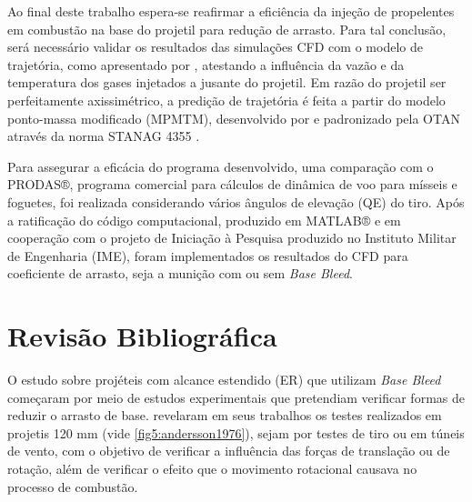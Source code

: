 Ao final deste trabalho espera-se reafirmar a eficiência da injeção de propelentes em combustão na base do projetil para redução de arrasto. Para tal conclusão, será necessário validar os resultados das simulações CFD com o modelo de trajetória, como apresentado por \cite{Rosendo2020}, atestando a influência da vazão e da temperatura dos gases injetados a jusante do projetil. Em razão do projetil ser perfeitamente axissimétrico, a predição de trajetória é feita a partir do modelo ponto-massa modificado (MPMTM), desenvolvido por \cite{Lieske1966} e padronizado pela OTAN através da norma STANAG 4355 \cite{stanag4355}. 

Para assegurar a eficácia do programa desenvolvido, uma comparação com o PRODAS®, programa comercial para cálculos de dinâmica de voo para mísseis e foguetes, foi realizada considerando vários ângulos de elevação (QE) do tiro. Após a ratificação do código computacional, produzido em MATLAB® e em cooperação com o projeto de Iniciação à Pesquisa produzido no Instituto Militar de Engenharia (IME), foram implementados os resultados do CFD para coeficiente de arrasto, seja a munição com ou sem \textit{Base Bleed}. 

\section{Revisão Bibliográfica}

O estudo sobre projéteis com alcance estendido (ER) que utilizam \textit{Base Bleed} começaram por meio de estudos experimentais que pretendiam verificar formas de reduzir o arrasto de base. \cite{Sedney1966,Andersson1976} revelaram em seus trabalhos os testes realizados em projetis 120 mm (vide \autoref{fig5:andersson1976}), sejam por testes de tiro ou em túneis de vento, com o objetivo de verificar a influência das forças de translação ou de rotação, além de verificar o efeito que o movimento rotacional causava no processo de combustão.

